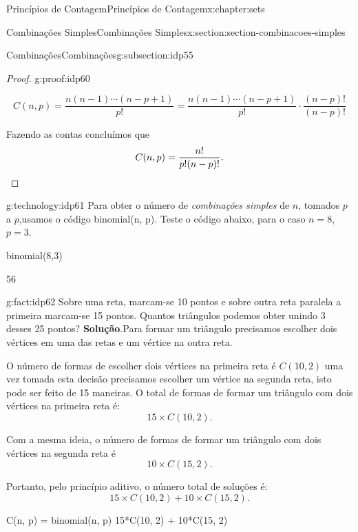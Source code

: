 \documentclass[oneside,10pt,]{book}
\newcommand{\blocktitlefont}{\relax}
\newcommand{\qedhere}{\relax}
\numberwithin{equation}{section}
\begin{document}
\begin{chapterptx}{Princípios de Contagem}{}{Princípios de Contagem}{}{}{x:chapter:sets}
\begin{sectionptx}{Combinações Simples}{}{Combinações Simples}{}{}{x:section:section-combinacoes-simples}
\begin{subsectionptx}{Combinações}{}{Combinações}{}{}{g:subsection:idp55}
\begin{proof}{}{g:proof:idp60}
\par
%
\begin{equation*}
C(n,p)  = \frac{n(n-1)\cdots(n-p+1)}{p!} = \frac{n(n-1)\cdots(n-p+1)}{p!} \cdot \frac{(n-p)!}{(n-p)!}
\end{equation*}
%
\par
Fazendo as contas concluímos que%
\begin{equation*}
C(n,p) = \frac{n!}{p!(n-p)!}.\qedhere
\end{equation*}
%
\end{proof}
\begin{technology}{}{g:technology:idp61}%
Para obter o número de \emph{combinações simples} de \(n\), tomados \(p\) a \(p\),usamos o código binomial(n, p). Teste o código abaixo, para o caso \(n=8\), \(p=3\).%
\begin{sageinput}
binomial(8,3)
\end{sageinput}
\begin{sageoutput}
56
\end{sageoutput}
\end{technology}
\begin{fact}{}{}{g:fact:idp62}%
Sobre uma reta, marcam-se 10 pontos e sobre outra reta paralela a primeira marcam-se 15 pontos. Quantos triângulos podemos obter unindo 3 desses 25 pontos?%
\textbf{\blocktitlefont Solução}.\quad{}Para formar um triângulo precisamos escolher dois vértices em uma das retas e um vértice na outra reta.%
\par
O número de formas de escolher dois vértices na primeira reta é \(C(10, 2)\) uma vez tomada esta decisão precisamos escolher um vértice na segunda reta, isto pode ser feito de 15 maneiras. O total de formas de formar um triângulo com dois vértices na primeira reta é:%
\begin{equation*}
15\times C(10, 2). 
\end{equation*}
%
\par
Com a mesma ideia, o número de formas de formar um triângulo com dois vértices na segunda reta é%
\begin{equation*}
10\times C(15, 2). 
\end{equation*}
%
\par
Portanto, pelo princípio aditivo, o número total de soluções é:%
\begin{equation*}
15\times C(10, 2) + 10\times C(15, 2). 
\end{equation*}
%
\begin{sageinput}
C(n, p) = binomial(n, p)
15*C(10, 2) + 10*C(15, 2)
\end{sageinput}

\end{fact}
\end{subsectionptx}
\end{sectionptx}
\end{chapterptx}
\end{document}

